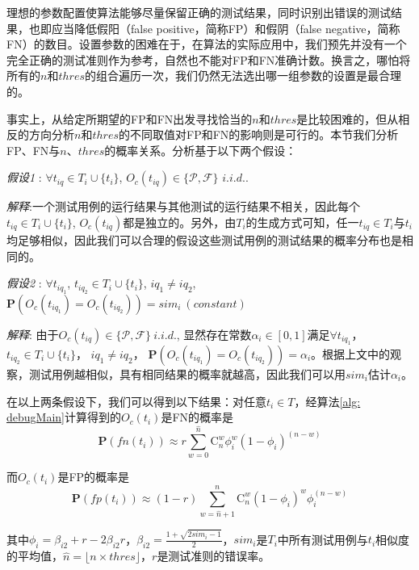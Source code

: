 理想的参数配置使算法能够尽量保留正确的测试结果，同时识别出错误的测试结果，也即应当降低假阳（false positive，简称FP）和假阴（false negative，简称FN）的数目。设置参数的困难在于，在算法的实际应用中，我们预先并没有一个完全正确的测试准则作为参考，自然也不能对FP和FN准确计数。换言之，哪怕将所有的$n$和$thres$的组合遍历一次，我们仍然无法选出哪一组参数的设置是最合理的。

事实上，从给定所期望的FP和FN出发寻找恰当的$n$和$thres$是比较困难的，但从相反的方向分析$n$和$thres$的不同取值对FP和FN的影响则是可行的。本节我们分析FP、FN与$n$、$thres$的概率关系。分析基于以下两个假设：

\textit{假设1} : $\forall t_{iq}\in T_i \cup \{t_i\}$, $O_c(t_{iq}) \in \{\mathcal{P}, \mathcal{F}\}$  $i.i.d.$.

\textit{解释}:一个测试用例的运行结果与其他测试的运行结果不相关，因此每个$t_{iq}\in T_i \cup \{t_i\}$, $O_c(t_{iq})$都是独立的。另外，由$T_i$的生成方式可知，任一$t_{iq}\in T_i$与$t_i$均足够相似，因此我们可以合理的假设这些测试用例的测试结果的概率分布也是相同的。

\textit{假设2} : $\forall t_{iq_1}$, $t_{iq_2} \in T_i \cup \{t_i\}$, $iq_1 \ne iq_2$,
$\mathbf{P}(O_c(t_{iq_1}) = O_c(t_{iq_2})) = {sim}_i\  (constant)$

\textit{解释}: 由于$O_c(t_{iq}) \in \{\mathcal{P}, \mathcal{F}\}\ i.i.d.$, 显然存在常数$\alpha_i \in [0,1]$满足$\forall t_{iq_1}$， $t_{iq_2} \in T_i \cup \{t_i\}$， $iq_1 \ne iq_2$， $\mathbf{P}(O_c(t_{iq_1}) = O_c(t_{iq_2})) = \alpha_i$。根据上文中的观察，测试用例越相似，具有相同结果的概率就越高，因此我们可以用${sim}_i$估计$\alpha_i$。

在以上两条假设下，我们可以得到以下结果：对任意$t_i \in T$，经算法\ref{alg: debugMain}计算得到的$O_c(t_i)$是FN的概率是	
\begin{equation}
\label{equ: fn single}
\mathbf{P}(fn(t_i))	\approx r \sum_{w = 0}^{\hat{n}}{\mathrm{C}_n^w{\phi_i^w (1-\phi_i)^{(n-w)}}}
\end{equation}

而$O_c(t_i)$是FP的概率是
\begin{equation}
\label{equ: fp single}
\mathbf{P}(fp(t_i)) \approx (1 - r) \sum_{w = \hat{n} + 1}^{n} \mathrm{C}_n^w{(1 - \phi_i)^w} \phi_i^{(n-w)}
\end{equation}

其中$\phi_i = \beta_{i2} + r - 2 \beta_{i2} r$，$\beta_{i2} = \frac{1 + \sqrt{2 sim_i - 1}}{2}$，$sim_i$是$T_i$中所有测试用例与$t_i$相似度的平均值，$\hat{n} = \lfloor n \times thres \rfloor$，$r$是测试准则的错误率。


